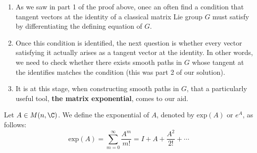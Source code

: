 \begin{remark}
    \begin{enumerate}
        \item[(i)] As we saw in part 1 of the proof above, onec an often find a condition that tangent vectors at the identity of a classical matrix Lie group \( G  \) must satisfy by differentiating the defining equation of \( G  \).
        \item[(ii)] Once this condition is identified, the next question is whether every vector satisfying it actually arises as a tangent vector at the identity. In other words, we need to check whether there exists smooth paths in \( G  \) whose tangent at the identifies matches the condition (this was part 2 of our solution).
        \item[(iii)] It is at this stage, when constructing smooth paths in \( G  \), that a particularly useful tool, \textbf{the matrix exponential}, comes to our aid.
    \end{enumerate}
\end{remark}

\begin{definition}
   Let \( A \in M(n,\C)  \). We define the exponential of \( A \), denoted by \( \text{exp}(A)  \) or \( e^{A} \), as follows:
   \[ \text{exp}(A) = \sum_{ m = 0  }^{ \infty  } \frac{ A^{m} }{ m!  }  = I + A + \frac{ A^{2} }{ 2!} + \cdots  \]
\end{definition}

